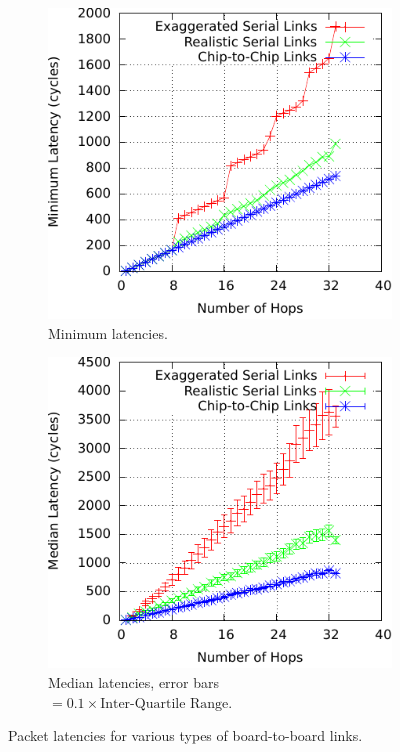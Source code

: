 				\begin{figure}
					\centering
					
					\begin{subfigure}[t]{0.45\textwidth}
						\centering
						\includegraphics[width=\textwidth]{figures/min-time-for-hops}
						\caption{Minimum latencies.}
						\label{fig:min-time-for-hops}
					\end{subfigure}
					\begin{subfigure}[t]{0.45\textwidth}
						\centering
						\includegraphics[width=\textwidth]{figures/median-time-for-hops-with-errbars}
						\caption{Median latencies, error bars $=
						0.1\times\textrm{Inter-Quartile Range}$.}
						\label{fig:median-time-for-hops-with-errbars}
					\end{subfigure}
					
					
					\caption{Packet latencies for various types of board-to-board
					links.}
					\label{fig:time-for-hops}
				\end{figure}
				

